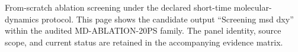 From-scratch ablation screening under the declared short-time molecular-dynamics protocol. This page shows the candidate output ``Screening msd dxy'' within the audited MD-ABLATION-20PS family. The panel identity, source scope, and current status are retained in the accompanying evidence matrix.
